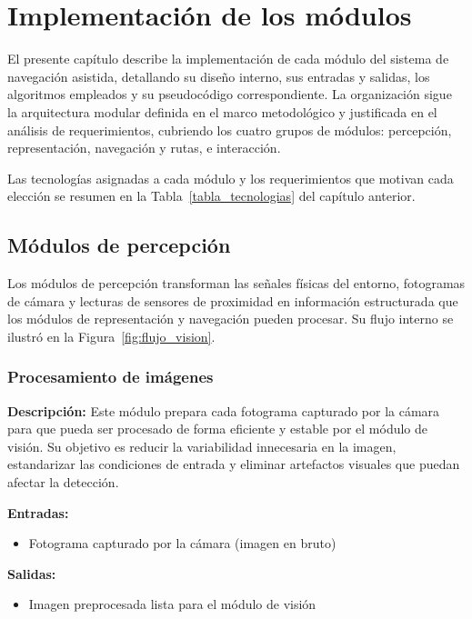  \chapter{Implementación de los módulos}

El presente capítulo describe la implementación de cada módulo del sistema de navegación
asistida, detallando su diseño interno, sus entradas y salidas, los algoritmos empleados
y su pseudocódigo correspondiente. La organización sigue la arquitectura modular definida
en el marco metodológico y justificada en el análisis de requerimientos, cubriendo los
cuatro grupos de módulos: percepción, representación, navegación y rutas, e interacción.

Las tecnologías asignadas a cada módulo y los requerimientos que motivan cada elección
se resumen en la Tabla~\ref{tabla_tecnologias} del capítulo anterior.

\section{Módulos de percepción}

Los módulos de percepción transforman las señales físicas del entorno, fotogramas de
cámara y lecturas de sensores de proximidad en información estructurada que los módulos
de representación y navegación pueden procesar. Su flujo interno se ilustró en la
Figura~\ref{fig:flujo_vision}.


\subsection{Procesamiento de imágenes}

\textbf{Descripción:}
Este módulo prepara cada fotograma capturado por la cámara para que pueda ser procesado
de forma eficiente y estable por el módulo de visión. Su objetivo es reducir la
variabilidad innecesaria en la imagen, estandarizar las condiciones de entrada y eliminar
artefactos visuales que puedan afectar la detección.

\textbf{Entradas:}
\begin{itemize}
    \item Fotograma capturado por la cámara (imagen en bruto)
\end{itemize}

\textbf{Salidas:}
\begin{itemize}
    \item Imagen preprocesada lista para el módulo de visión
\end{itemize}

